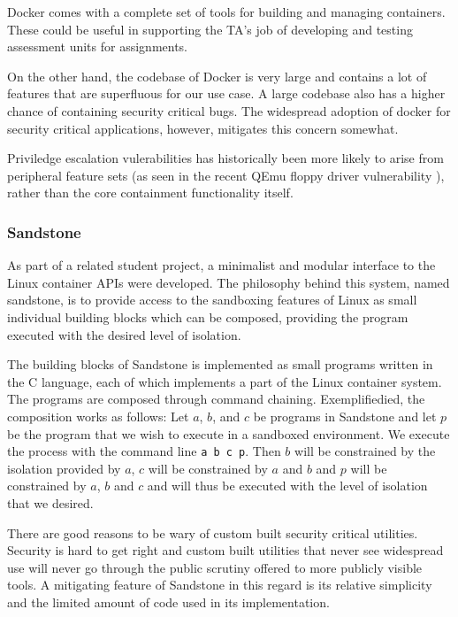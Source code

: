 Docker comes with a complete set of tools for building and managing
containers. These could be useful in supporting the TA's job of
developing and testing assessment units for assignments.

On the other hand, the codebase of Docker is very large and
contains a lot of features that are superfluous for our use
case. A large codebase also has a higher chance of containing security
critical bugs. The widespread adoption of docker for security critical
applications, however, mitigates this concern somewhat.

Priviledge escalation vulerabilities has historically been more likely
to arise from peripheral feature sets (as seen in the recent QEmu
floppy driver vulnerability \cite{venom}), rather than the core containment
functionality itself.



\subsubsection{Sandstone}
As part of a related student project, a minimalist and modular
interface to the Linux container APIs were developed. The philosophy
behind this system, named sandstone, is to provide access to
the sandboxing features of Linux as small individual building blocks
which can be composed, providing the program executed with the
desired level of isolation.

The building blocks of Sandstone is implemented as small programs
written in the C language, each of which implements a part of the
Linux container system. The programs are composed through command
chaining. Exemplifiedied, the composition works as follows: Let $a$,
$b$, and $c$ be programs in Sandstone and let $p$ be the program that
we wish to execute in a sandboxed environment. We execute the process
with the command line \texttt{a b c p}. Then $b$ will be constrained
by the isolation provided by $a$, $c$ will be constrained by $a$ and
$b$ and $p$ will be constrained by $a$, $b$ and $c$ and will thus be
executed with the level of isolation that we desired. \cite{onlineta}

There are good reasons to be wary of custom built security
critical utilities. Security is hard to get right and custom built
utilities that never see widespread use will never go through the
public scrutiny offered to more publicly visible tools. A mitigating
feature of Sandstone in this regard is its relative simplicity and the
limited amount of code used in its implementation.

